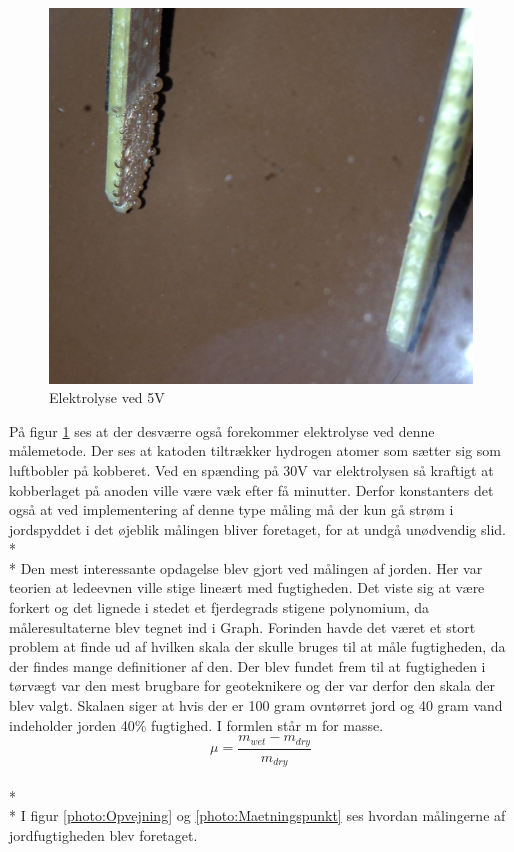 \begin{figure}[H]
	\centering 
	\includegraphics[scale=0.1]{HardwareArkitektur/Sensore/Jordfugt_billeder/Elektrolyse.JPG}
	\caption{Elektrolyse ved 5V}
	\label{photo:Elektrolyse}
\end{figure}  

På figur \ref{photo:Elektrolyse} ses at der desværre også forekommer elektrolyse ved denne målemetode. Der ses at katoden tiltrækker hydrogen atomer som sætter sig som luftbobler på kobberet. Ved en spænding på 30V var elektrolysen så kraftigt at kobberlaget på anoden ville være væk efter få minutter. Derfor konstanters det også at ved implementering af denne type måling må der kun gå strøm i jordspyddet i det øjeblik målingen bliver foretaget, for at undgå unødvendig slid. 
\\*
\\*
Den mest interessante opdagelse blev gjort ved målingen af jorden. Her var teorien at ledeevnen ville stige lineært med fugtigheden. Det viste sig at være forkert og det lignede i stedet et fjerdegrads stigene polynomium, da måleresultaterne blev tegnet ind i Graph. Forinden havde det været et stort problem at finde ud af hvilken skala der skulle bruges til at måle fugtigheden, da der findes mange definitioner af den. Der blev fundet frem til at fugtigheden i tørvægt var den mest brugbare for geoteknikere og der var derfor den skala der blev valgt. Skalaen siger at hvis der er 100 gram ovntørret jord og 40 gram vand indeholder jorden 40\% fugtighed. I formlen står m for masse.
$$ \mu = \frac{m_{wet}-m_{dry} }{m_{dry}}$$ 
\\*
\\*
I figur \ref{photo:Opvejning} og \ref{photo:Maetningspunkt} ses hvordan målingerne af jordfugtigheden blev foretaget. 

